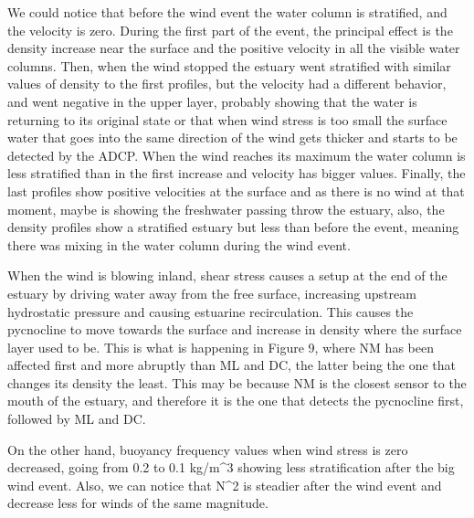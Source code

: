 \documentclass[11pt,letterpaper]{article}
\begin{document}
We could notice that before the wind event the water column is stratified, and the velocity is zero. During the first part of the event, the principal effect is the density increase near the surface and the positive velocity in all the visible water columns. Then, when the wind stopped the estuary went stratified with similar values of density to the first profiles, but the velocity had a different behavior, and went negative in the upper layer, probably showing that the water is returning to its original state or that when wind stress is too small the surface water that goes into the same direction of the wind gets thicker and starts to be detected by the ADCP. When the wind reaches its maximum the water column is less stratified than in the first increase and velocity has bigger values. Finally, the last profiles show positive velocities at the surface and as there is no wind at that moment, maybe is showing the freshwater passing throw the estuary, also, the density profiles show a stratified estuary but less than before the event, meaning there was mixing in the water column during the wind event.

When the wind is blowing inland, shear stress causes a setup at the end of the estuary by driving water away from the free surface, increasing upstream hydrostatic pressure and causing estuarine recirculation. This causes the pycnocline to move towards the surface and increase in density where the surface layer used to be. This is what is happening in Figure 9, where NM has been affected first and more abruptly than ML and DC, the latter being the one that changes its density the least. This may be because NM is the closest sensor to the mouth of the estuary, and therefore it is the one that detects the pycnocline first, followed by ML and DC.

On the other hand, buoyancy frequency values when wind stress is zero decreased, going from 0.2 to 0.1 kg/m^3  showing less stratification after the big wind event. Also, we can notice that N^2 is steadier after the wind event and decrease less for winds of the same magnitude.

\end{document}
